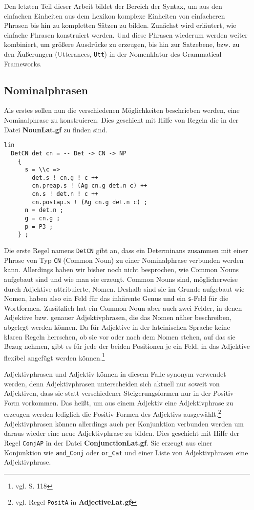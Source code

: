 Den letzten Teil dieser Arbeit bildet der Bereich der Syntax, um aus den einfachen Einheiten aus dem Lexikon komplexe Einheiten von einfacheren Phrasen bis hin zu kompletten Sätzen zu bilden. Zunächst wird erläutert, wie einfache Phrasen konstruiert werden. Und diese Phrasen wiederum werden weiter kombiniert, um größere Ausdrücke zu erzeugen, bis hin zur Satzebene, bzw. zu den Äußerungen (Utterances, \texttt{Utt}) in der Nomenklatur des Grammatical Frameworks.
\subsection{Nominalphrasen}
\label{subsec:nominalphrasen}
Als erstes sollen nun die verschiedenen Möglichkeiten beschrieben werden, eine Nominalphrase zu konstruieren. Dies geschieht mit Hilfe von Regeln die in der Datei \textbf{NounLat.gf} zu finden sind. \par
\begin{lstlisting}[float=h!tp,caption={Die Syntaxregel \texttt{DetCN}, um ein Determinans und ein Common Nouns zu einer \texttt{NP} zu verbinden (vgl. \textbf{NounLat.gf}},label={GF-Noun-DetCN}]
lin
  DetCN det cn = -- Det -> CN -> NP
    {
      s = \\c => 
        det.s ! cn.g ! c ++ 
        cn.preap.s ! (Ag cn.g det.n c) ++ 
        cn.s ! det.n ! c ++ 
        cn.postap.s ! (Ag cn.g det.n c) ; 
      n = det.n ;  
      g = cn.g ; 
      p = P3 ;
    } ;
\end{lstlisting}
Die erste Regel namens \texttt{DetCN} gibt an, dass ein Determinans zusammen mit einer Phrase von Typ \texttt{CN} (Common Noun) zu einer Nominalphrase verbunden werden kann. Allerdings haben wir bisher noch nicht besprochen, wie Common Nouns aufgebaut sind und wie man sie erzeugt. Common Nouns sind, möglicherweise durch Adjektive attribuierte, Nomen. Deshalb sind sie im Grunde aufgebaut wie Nomen, haben also ein Feld für das inhärente Genus und ein \texttt{s}-Feld für die Wortformen. Zusätzlich hat ein Common Noun aber auch zwei Felder, in denen Adjektive bzw. genauer Adjektivphrasen, die das Nomen näher beschreiben, abgelegt werden können. Da für Adjektive in der lateinischen Sprache keine klaren Regeln herrschen, ob sie vor oder nach dem Nomen stehen, auf das sie Bezug nehmen, gibt es für jede der beiden Positionen je ein Feld, in das Adjektive flexibel angefügt werden können.\footnote{vgl. \cite{BAYER-LINDAUER1994} S. 118} \par
Adjektivphrasen und Adjektiv können in diesem Falle synonym verwendet werden, denn Adjektivphrasen unterscheiden sich aktuell nur soweit von Adjektiven, dass sie statt verschiedener Steigerungsformen nur in der Positiv-Form vorkommen. Das heißt, um aus einem Adjektiv eine Adjektivphrase zu erzeugen werden lediglich die Positiv-Formen des Adjektivs ausgewählt.\footnote{vgl. Regel \texttt{PositA} in \textbf{AdjectiveLat.gf}} Adjektivphrasen können allerdings auch per Konjunktion verbunden werden um daraus wieder eine neue Adjektivphrase zu bilden. Dies geschieht mit Hilfe der Regel \texttt{ConjAP} in der Datei \textbf{ConjunctionLat.gf}. Sie erzeugt aus einer Konjunktion wie \texttt{and\_Conj} oder \texttt{or\_Cat} und einer Liste von Adjektivphrasen eine Adjektivphrase. \par
